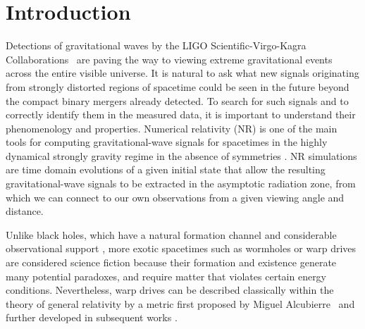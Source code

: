 \documentclass[twocolumn, numberedappendix, twocolappendix,apj, iop, a4paper]{openjournal}
\begin{document}
\section{Introduction}
Detections of gravitational waves by the LIGO Scientific-Virgo-Kagra Collaborations~\citep[e.g.,][]{LIGOScientific:2018mvr,LIGOScientific:2020ibl,KAGRA:2021vkt} are paving the way to viewing extreme gravitational events across the entire visible universe. It is natural to ask what new signals originating from strongly distorted regions of spacetime could be seen in the future beyond the compact binary mergers already detected. To search for such signals and to correctly identify them in the measured data, it is important to understand their phenomenology and properties. Numerical relativity (NR) is one of the main tools for computing gravitational-wave signals for spacetimes in the highly dynamical strongly gravity regime in the absence of symmetries \citep{Gourgoulhon:2007ue,Alcubierre:2008co,Baumgarte:2010,Baumgarte:2021skc}. NR simulations are time domain evolutions of a given initial state that allow the resulting gravitational-wave signals to be extracted in the asymptotic radiation zone, from which we can connect to our own observations from a given viewing angle and distance.

Unlike black holes, which have a natural formation channel \citep{Chandrasekhar:1931ih,Penrose:1964wq} and considerable observational support \citep{EventHorizonTelescope:2019dse,LIGOScientific:2016aoc,Ghez:2008ms}, more exotic spacetimes such as wormholes or warp drives \citep{Lobo:2007zb,Santiago:2021xjg} are considered science fiction because their formation and existence generate many potential paradoxes, and require matter that violates certain energy conditions. Nevertheless, warp drives can be described classically within the theory of general relativity by a metric first proposed by Miguel Alcubierre~\citep{Alcubierre:1994tu} and further developed in subsequent works \citep[e.g.,][]{Natario:2001tk,VanDenBroeck:1999sn,Krasnikov:1995ad,Everett:1997hb}.
\end{document}
